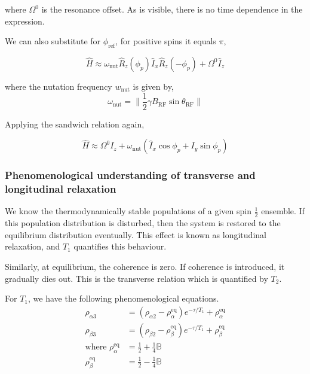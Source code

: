 			where $\Omega^0$ is the resonance offset.
			As is visible, there is no time dependence in the expression.

			We can also substitute for $\phi_\text{ref}$, for positive spins it equals $\pi$,


			\begin{equation}
			\hat{{{H}}} \approx \omega_\text{nut} \hat{R}_z (\phi_p) \hat{I}_x \hat{R}_z (-\phi_p) + \Omega^0 \hat{I}_z
			\end{equation}

			where the nutation frequency $w_\text{nut}$ is given by, 
			\begin{equation}
			\omega_\text{nut} = \| \frac{1}{2} \gamma B_\text{RF} \sin \theta_\text{RF} \|
			\end{equation} 

			Applying the sandwich relation again, 

			\begin{equation}
			\hat{{{H}}} \approx \Omega^0 I_z + \omega_\text{nut}(\hat I_x \cos \phi_p + I_y \sin \phi_p)
			\end{equation}

		\subsubsection{Phenomenological understanding of transverse and longitudinal relaxation}
			We know the thermodynamically stable populations of a given spin $\frac 1 2$ ensemble. If this population distribution is disturbed, then the system is restored to the equilibrium distribution eventually. This effect is known as longitudinal relaxation, and $T_1$ quantifies this behaviour.

			Similarly, at equilibrium, the coherence is zero. If coherence is introduced, it gradually dies out. This is the transverse relation which is quantified by $T_2$.

			For $T_1$, we have the following phenomenological equations.
			\begin{align}
				\rho_{\alpha 3} &= (\rho_{\alpha 2} - \rho_{\alpha}^\text{eq})e^{-\tau/T_1} + \rho_{\alpha}^\text{eq} \\
				\rho_{\beta 3} &= (\rho_{\beta 2} - \rho_{\beta}^\text{eq})e^{-\tau/T_1} + \rho_{\beta}^\text{eq} \\
				\text{where  } \rho_{\alpha}^\text{eq}&=\frac 1 2 + \frac 1 4 \mathbb B \\
							\rho_{\beta}^\text{eq}&=\frac 1 2 - \frac 1 4 \mathbb B
			\end{align}


